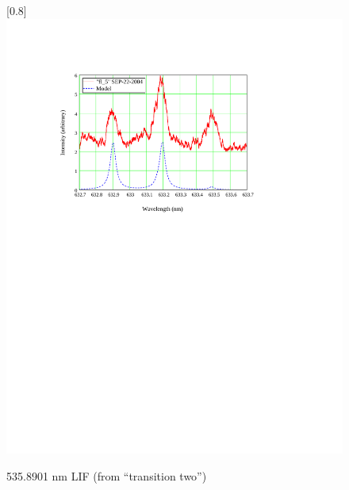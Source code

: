 \begin{figure}
\scalebox{0.8}[0.8]{
\includegraphics[bb=10 450 489 685]
{fl_5/fl_5.pdf}
}
\caption{535.8901 nm LIF (from ``transition two'')}
\label{fl_5}
\end{figure}

